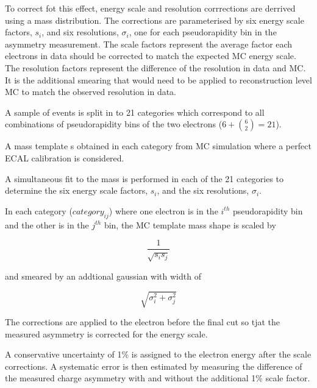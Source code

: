 To correct fot this effect, energy scale and resolution corrrections are
derrived using a \Zee mass distribution. The corrections are parameterised by
six energy scale factors, $s_i$, and six resolutions, $\sigma_i$, one for each
pseudorapidity bin in the asymmetry measurement.
The scale factors represent the average factor each electrons \Pt in data
should be corrected to match the expected \ac{MC} energy scale.
The resolution factors represent the difference of the resolution in data and
\ac{MC}. It is the additional smearing that would need to be applied to
reconstruction level \ac{MC} to match the observed resolution in data.

A sample of \Zee events is  split in to 21 categories which correspond to all
combinations of pseudorapidity bins of the two electrons ($6+\binom{6}{2} = 21$).

A mass template s obtained in each category from \ac{MC} simulation where a
perfect \ac{ECAL} calibration is considered.

A simultaneous fit to the \Zee mass is performed in each of the 21 categories
to determine the six energy scale factors, $s_i$, and the six resolutions, 
$\sigma_i$.

In each category ($category_{ij}$) where one electron is in the $i^{th}$
pseudorapidity bin and the other is in the $j^{th}$ bin, the \ac{MC} template
mass shape is scaled by 

\begin{equation}
    \frac{1}{\sqrt{s_i s_j} } 
\end{equation}

and smeared by an addtional gaussian with width of 

\begin{equation}
    \sqrt{\sigma_i^2+\sigma_j^2}
\end{equation}


The corrections are applied to the electron before the final \Pt cut so tjat
the measured asymmetry is corrected for the energy scale.

A conservative uncertainty of \unit{1}{\% } is assigned to the electron energy
after the scale corrections. A systematic error is then estimated by measuring
the difference of the measured charge asymmetry with and without the additional
\unit{1}{\% } scale factor.

